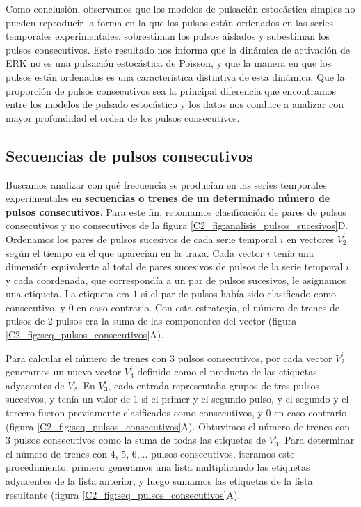 \documentclass[./main.tex]{subfiles}
\begin{document}
Como conclusión, observamos que los modelos de pulsación estocástica simples no pueden reproducir la forma en la que los pulsos están ordenados en las series temporales experimentales: sobrestiman los pulsos aislados y subestiman los pulsos consecutivos. Este resultado nos informa que la dinámica de activación de ERK no es una pulsación estocástica de Poisson, y que la manera en que los pulsos están ordenados es una característica distintiva de esta dinámica. Que la proporción de pulsos consecutivos sea la principal diferencia que encontramos entre los modelos de pulsado estocástico y los datos nos conduce a analizar con mayor profundidad el orden de los pulsos consecutivos. 


\subsection{Secuencias de pulsos consecutivos}
\label{C2_ssec:seq_pulsos_cons}


Buscamos analizar con qué frecuencia se producían en las series temporales experimentales en \textbf{secuencias o trenes de un determinado número de pulsos consecutivos}. Para este fin, retomamos clasificación de pares de pulsos consecutivos y no consecutivos de la figura \ref{C2_fig:analisis_pulsos_sucesivos}D. Ordenamos los pares de pulsos sucesivos de cada serie temporal $i$ en vectores $V^i_2$ según el tiempo en el que aparecían en la traza. Cada vector $i$ tenía una dimensión equivalente al total de pares sucesivos de pulsos de la serie temporal $i$, y cada coordenada, que correspondía a un par de pulsos sucesivos, le asignamos una etiqueta. La etiqueta era $1$ si el par de pulsos había sido clasificado como consecutivo, y $0$ en caso contrario. Con esta estrategia, el número de trenes de pulsos de $2$ pulsos era la suma de las componentes del vector (figura \ref{C2_fig:seq_pulsos_consecutivos}A).


Para calcular el número de trenes con $3$ pulsos consecutivos, por cada vector $V^i_2$ generamos un nuevo vector $V^i_3$ definido como el producto de las etiquetas adyacentes de $V^i_2$. En $V^i_3$, cada entrada representaba grupos de tres pulsos sucesivos, y tenía un valor de 1 si el primer y el segundo pulso, y el segundo y el tercero fueron previamente clasificados como consecutivos, y 0 en caso contrario (figura \ref{C2_fig:seq_pulsos_consecutivos}A). Obtuvimos el número de trenes con 3 pulsos consecutivos como la suma de todas las etiquetas de $V^i_3$. Para determinar el número de trenes con 4, 5, 6,... pulsos consecutivos, iteramos este procedimiento: primero generamos una lista multiplicando las etiquetas adyacentes de la lista anterior, y luego sumamos las etiquetas de la lista resultante (figura \ref{C2_fig:seq_pulsos_consecutivos}A).
\end{document}

